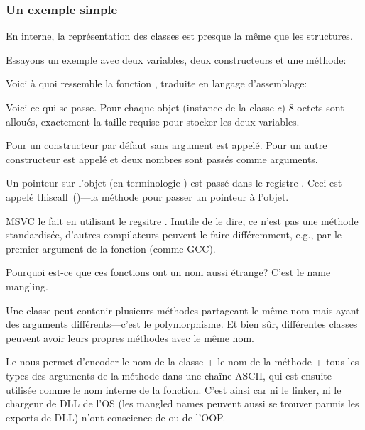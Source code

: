 \subsubsection{Un exemple simple}

En interne, la représentation des classes \Cpp est presque la même que les structures.

Essayons un exemple avec deux variables, deux constructeurs et une méthode:




Voici à quoi ressemble la fonction \main, traduite en langage d'assemblage:



Voici ce qui se passe.
Pour chaque objet (instance de la classe $c$) 8 octets sont alloués, exactement la
taille requise pour stocker les deux variables.

Pour  un constructeur par défaut sans argument  est appelé.
Pour  un autre constructeur  est appelé et deux nombres
sont passés comme arguments.

\label{thiscall}

Un pointeur sur l'objet (\ITthis en terminologie \Cpp) est passé dans le registre \ECX.
Ceci est appelé thiscall~()---la méthode pour passer un pointeur
à l'objet.

MSVC le fait en utilisant le regsitre \ECX. Inutile de le dire, ce n'est pas une
méthode standardisée, d'autres compilateurs peuvent le faire différemment, e.g.,
par le premier argument de la fonction (comme GCC).

\label{namemangling}

Pourquoi est-ce que ces fonctions ont un nom aussi étrange?
C'est le \gls{name mangling}.

Une classe \Cpp peut contenir plusieurs méthodes partageant le même nom mais ayant
des arguments différents---c'est le polymorphisme.
Et bien sûr, différentes classes peuvent avoir leurs propres méthodes avec le même nom.


Le  nous permet d'encoder le nom de la classe + le nom de la méthode +
tous les types des arguments de la méthode dans une chaîne ASCII, qui est ensuite
utilisée comme le nom interne de la fonction.
C'est ainsi car ni le linker, ni le chargeur de DLL de l'\ac{OS} (les mangled names
peuvent aussi se trouver parmis les exports de DLL) n'ont conscience de \Cpp ou de
l'\ac{OOP}.

